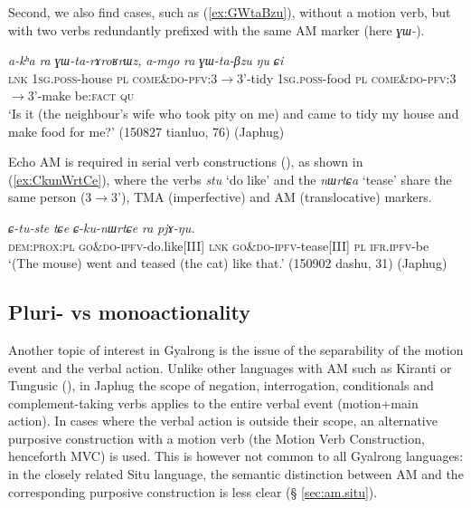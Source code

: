 \documentclass[oneside,a4paper,11pt]{article}
\newcommand{\ipa}[1]{{\phon\textit{#1}}}
\newcommand{\forme}[1]{\textit{\phon#1}}
\newcommand{\japhug}[2]{\textit{\phon#1} `#2'}
\newcommand{\rouge}[1]{{\color{red}#1}}
\begin{document}
Second, we also find cases, such as (\ref{ex:GWtaBzu}), without a motion verb, but with two verbs redundantly prefixed with the same AM marker (here \forme{ɣɯ-}).

\begin{exe}
\ex \label{ex:GWtaBzu}
\gll \ipa{tɕe}	\ipa{a-kʰa}	\ipa{ra}	\ipa{\rouge{ɣɯ}-ta-rɤroʁrɯz,}	\ipa{a-mgo}	\ipa{ra}	\ipa{\rouge{ɣɯ}-ta-βzu}	\ipa{ŋu}	\ipa{ɕi} \\
\textsc{lnk} \textsc{1sg}.\textsc{poss}-house \textsc{pl} \rouge{\textsc{come\&do}}-\textsc{pfv}:3$\rightarrow$3'-tidy 
 \textsc{1sg}.\textsc{poss}-food \textsc{pl} \rouge{\textsc{come\&do}}-\textsc{pfv}:3$\rightarrow$3'-make be:\textsc{fact} \textsc{qu} \\ 
\glt `Is it (the neighbour's wife who took pity on me) and came to tidy my house and make food for me?'  (150827 tianluo, 76) (Japhug)
\end{exe}


Echo AM is required in serial verb constructions (\citealt[253-255]{jacques16complementation}), as shown in (\ref{ex:CkunWrtCe}), where the verbs \japhug{stu}{do like} and the \japhug{nɯrtɕa}{tease} share the same person (3$\rightarrow$3'), TMA (imperfective) and AM (translocative) markers.

\begin{exe}
\ex \label{ex:CkunWrtCe}
\gll \ipa{kɯra}	\ipa{\rouge{ɕ}-tu-ste}	\ipa{tɕe}	\ipa{\rouge{ɕ}-ku-nɯrtɕe}	\ipa{ra}	\ipa{pjɤ-ŋu.} \\
\textsc{dem}:\textsc{prox}:\textsc{pl} \rouge{\textsc{go\&do}}-\textsc{ipfv}-do.like[III] \textsc{lnk}  \rouge{\textsc{go\&do}}-\textsc{ipfv}-tease[III] \textsc{pl} \textsc{ifr}.\textsc{ipfv}-be \\
\glt `(The mouse) went and teased (the cat) like that.' (150902 dashu, 31) (Japhug)
\end{exe}


 \subsection{Pluri- vs monoactionality} \label{sec:am.japhug}
Another topic of interest in Gyalrong is the issue of the separability of the motion event and the verbal action. Unlike other languages with AM such as Kiranti or Tungusic (\citealt{stojnova16nda, fuente18am}), in Japhug the scope of negation, interrogation, conditionals and complement-taking verbs applies to the entire verbal event (motion+main action). In cases where the verbal action is outside their scope, an alternative purposive construction with a motion verb (the Motion Verb Construction, henceforth MVC) is used. This is however not common to all Gyalrong languages: in the closely related Situ language, the semantic distinction between AM and the corresponding purposive construction is less clear (§ \ref{sec:am.situ}). 
 
\end{document}
